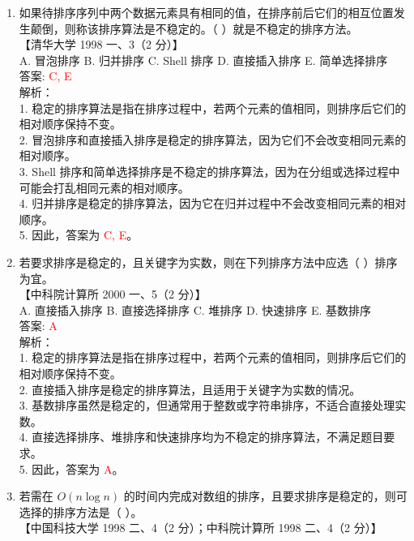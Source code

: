 \documentclass[lang=cn,newtx,10pt,scheme=chinese]{../../../elegantbook}
\begin{document}
\begin{enumerate}
    \item 如果待排序序列中两个数据元素具有相同的值，在排序前后它们的相互位置发生颠倒，则称该排序算法是不稳定的。（ ）就是不稳定的排序方法。\\
    【清华大学 1998 一、3（2 分）】\\

    A. 冒泡排序 \quad B. 归并排序 \quad C. Shell 排序 \quad D. 直接插入排序 \quad E. 简单选择排序 \\

    答案: \textcolor{red}{C, E} \\

    解析：\\
    1. 稳定的排序算法是指在排序过程中，若两个元素的值相同，则排序后它们的相对顺序保持不变。\\
    2. 冒泡排序和直接插入排序是稳定的排序算法，因为它们不会改变相同元素的相对顺序。\\
    3. Shell 排序和简单选择排序是不稳定的排序算法，因为在分组或选择过程中可能会打乱相同元素的相对顺序。\\
    4. 归并排序是稳定的排序算法，因为它在归并过程中不会改变相同元素的相对顺序。\\
    5. 因此，答案为 \textcolor{red}{C, E}。\\ 

    \item 若要求排序是稳定的，且关键字为实数，则在下列排序方法中应选（ ）排序为宜。\\
    【中科院计算所 2000 一、5（2 分）】\\

    A. 直接插入排序 \quad B. 直接选择排序 \quad C. 堆排序 \quad D. 快速排序 \quad E. 基数排序 \\

    答案: \textcolor{red}{A} \\

    解析：\\
    1. 稳定的排序算法是指在排序过程中，若两个元素的值相同，则排序后它们的相对顺序保持不变。\\
    2. 直接插入排序是稳定的排序算法，且适用于关键字为实数的情况。\\
    3. 基数排序虽然是稳定的，但通常用于整数或字符串排序，不适合直接处理实数。\\
    4. 直接选择排序、堆排序和快速排序均为不稳定的排序算法，不满足题目要求。\\
    5. 因此，答案为 \textcolor{red}{A}。\\

    \item 若需在 $O(n \log n)$ 的时间内完成对数组的排序，且要求排序是稳定的，则可选择的排序方法是（ ）。\\
    【中国科技大学 1998 二、4（2 分）；中科院计算所 1998 二、4（2 分）】\\


\end{enumerate}
\end{document}

